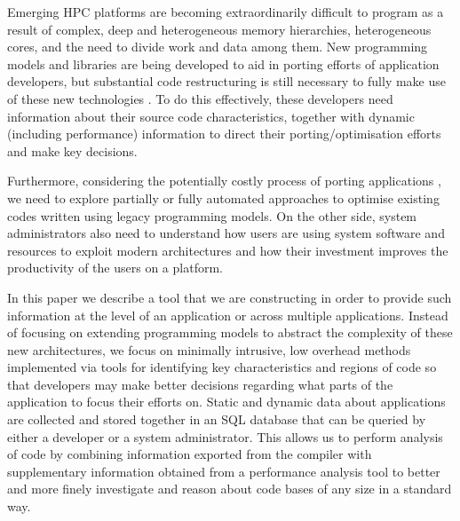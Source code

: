 Emerging HPC platforms are becoming extraordinarily difficult to program as a result of complex, deep and heterogeneous memory hierarchies, heterogeneous cores, and the need to divide work and data among them.
New programming models and libraries are being developed to aid in porting efforts of application developers, but substantial code restructuring is still necessary to fully make use of these new technologies \cite{anantharaj2013}\cite{titan}.
To do this effectively, these developers need information about their source code characteristics, together with dynamic (including performance) information to direct their porting/optimisation efforts and make key decisions.



Furthermore, considering the potentially costly process of porting applications \cite{larrea2016early}, we need to explore partially or fully automated approaches to optimise existing codes written using legacy programming models.
On the other side, system administrators also need to understand how users are using system software and resources to exploit modern architectures and how their investment improves the productivity of the users on a platform.

In this paper we describe a tool that we are constructing in order to provide such information at the level of an application or across multiple applications.
Instead of focusing on extending programming models to abstract the complexity of these new architectures, we focus on minimally intrusive, low overhead methods implemented via tools for identifying key characteristics and regions of code so that developers may make better decisions regarding what parts of the application to focus their efforts on.
Static and dynamic data about applications are collected and stored together in an \acs{SQL} database that can be queried by either a developer or a system administrator.
This allows us to perform analysis of code by combining information exported from the compiler with supplementary information obtained from a performance analysis tool to better and more finely investigate and reason about code bases of any size in a standard way.

